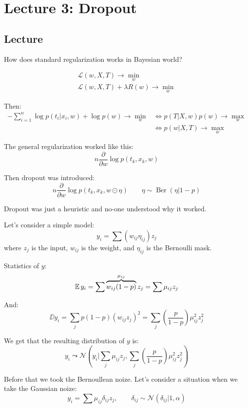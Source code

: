 \section{Lecture 3: Dropout}

\subsection{Lecture}

How does standard regularization works in Bayesian world?

\begin{gather*}
    \mathcal{L}(w, X, T) \to \min_w \\ 
    \mathcal{L}(w, X, T) + \lambda R(w) \to \min_w
\end{gather*}

Then: 
\begin{align*}
    - \sum_{i=1}^n \log p(t_i | x_i, w) + \log p(w) \to \min_w 
    &\Longleftrightarrow p (T | X, w) p(w) \to \max_w \\
    &\Longleftrightarrow p(w | X, T) \to \max_w
\end{align*}

The general regularization worked like this: 
\[ 
    n \frac{\partial}{\partial w} \log p(t_k, x_k, w)
\] 

Then dropout was introduced: 
\[ 
    n \frac{\partial}{\partial w} \log p(t_k, x_k, w \odot \eta) \qquad \eta \sim \operatorname{Ber}(\eta | 1 - p)
\] 

Dropout was just a heuristic and no-one understood why it worked. 

Let's consider a simple model:
\[ 
    y_i = \sum (w_{ij} \eta_{ij}) z_j
\] 
where $z_j$ is the input, $w_{ij}$ is the weight, and $\eta_{ij}$ is the Bernoulli mask.

Statistics of $y$: 
\[ 
    \operatorname{\mathbb{E}} y_i = \sum \overbrace{w_{ij} (1 - p)}^{\mu_{ij}} z_j = \sum \mu_{ij} z_j
\] 

And: 
\[ 
    \DD y_i = \sum_j p (1 - p) (w_{ij} z_j)^2 = \sum_j \left( \frac{p}{1 - p}\right) \mu_{ij}^2 z_j^2
\] 

We get that the resulting distribution of $y$ is: 
\[
    y_i \leadsto \mathcal{N} (y_i | \sum_j \mu_{ij} z_j, \sum_j \left( \frac{p}{1 - p}\right) \mu_{ij}^2 z_j^2)
\] 

Before that we took the Bernoullean noize. Let's consider a situation when we take the Gaussian noize:
\[ 
    y_i = \sum \mu_{ij} \delta_{ij} z_j, \qquad \delta_{ij} \sim \mathcal{N} (\delta_{ij} | 1, \alpha)
\]

